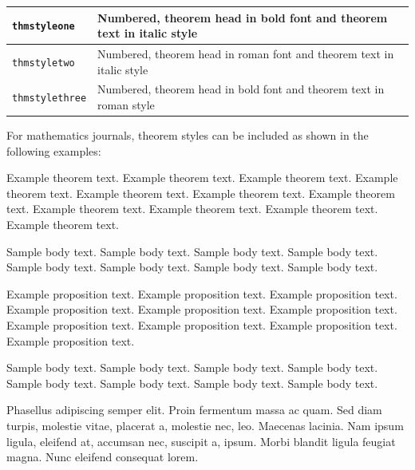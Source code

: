 \documentclass[pdflatex,sn-mathphys-ay]{sn-jnl}
\begin{document}
\bigskip
\begin{tabular}{|l|p{19pc}|}
\hline
\verb+thmstyleone+ & Numbered, theorem head in bold font and theorem text in italic style \\\hline
\verb+thmstyletwo+ & Numbered, theorem head in roman font and theorem text in italic style \\\hline
\verb+thmstylethree+ & Numbered, theorem head in bold font and theorem text in roman style \\\hline
\end{tabular}
\bigskip

For mathematics journals, theorem styles can be included as shown in the following examples:

\begin{theorem}\label{thm1}
Example theorem text. Example theorem text. Example theorem text. Example theorem text. Example theorem text. 
Example theorem text. Example theorem text. Example theorem text. Example theorem text. Example theorem text. 
Example theorem text. 
\end{theorem}

Sample body text. Sample body text. Sample body text. Sample body text. Sample body text. Sample body text. Sample body text. Sample body text.

\begin{proposition}
Example proposition text. Example proposition text. Example proposition text. Example proposition text. Example proposition text. 
Example proposition text. Example proposition text. Example proposition text. Example proposition text. Example proposition text. 
\end{proposition}

Sample body text. Sample body text. Sample body text. Sample body text. Sample body text. Sample body text. Sample body text. Sample body text.

\begin{example}
Phasellus adipiscing semper elit. Proin fermentum massa
ac quam. Sed diam turpis, molestie vitae, placerat a, molestie nec, leo. Maecenas lacinia. Nam ipsum ligula, eleifend
at, accumsan nec, suscipit a, ipsum. Morbi blandit ligula feugiat magna. Nunc eleifend consequat lorem. 
\end{example}
\end{document}

